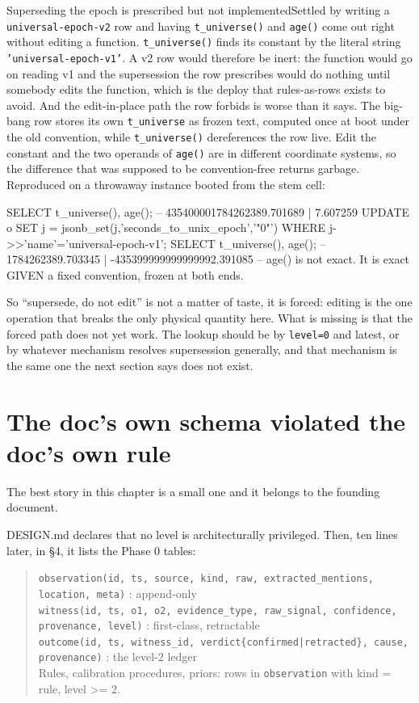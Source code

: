 \begin{Open}{Superseding the epoch is prescribed but not implemented}{Settled by writing a \texttt{universal-epoch-v2} row and having \texttt{t\_universe()} and \texttt{age()} come out right without editing a function.}
\texttt{t\_universe()} finds its constant by the literal string \texttt{'universal-epoch-v1'}. A v2 row would therefore be inert: the function would go on reading v1 and the supersession the row prescribes would do nothing until somebody edits the function, which is the deploy that rules-as-rows exists to avoid. And the edit-in-place path the row forbids is worse than it says. The big-bang row stores its own \texttt{t\_universe} as frozen text, computed once at boot under the old convention, while \texttt{t\_universe()} dereferences the row live. Edit the constant and the two operands of \texttt{age()} are in different coordinate systems, so the difference that was supposed to be convention-free returns garbage. Reproduced on a throwaway instance booted from the stem cell:
\begin{Check}
SELECT t_universe(), age();
--  435400001784262389.701689 |   7.607259
UPDATE o SET j = jsonb_set(j,'{seconds_to_unix_epoch}','"0"')
  WHERE j->>'name'='universal-epoch-v1';
SELECT t_universe(), age();
--  1784262389.703345 | -435399999999999992.391085
-- age() is not exact. It is exact GIVEN a fixed convention, frozen at both ends.
\end{Check}
So ``supersede, do not edit'' is not a matter of taste, it is forced: editing is the one operation that breaks the only physical quantity here. What is missing is that the forced path does not yet work. The lookup should be by \texttt{level=0} and latest, or by whatever mechanism resolves supersession generally, and that mechanism is the same one the next section says does not exist.
\end{Open}

\section{The doc's own schema violated the doc's own rule}

The best story in this chapter is a small one and it belongs to the founding document.

DESIGN.md declares that no level is architecturally privileged. Then, ten lines later, in \S4, it lists the Phase 0 tables:

\begin{quote}
\texttt{observation(id, ts, source, kind, raw, extracted\_mentions, location, meta)} : append-only \\
\texttt{witness(id, ts, o1, o2, evidence\_type, raw\_signal, confidence, provenance, level)} : first-class, retractable \\
\texttt{outcome(id, ts, witness\_id, verdict\{confirmed|retracted\}, cause, provenance)} : the level-2 ledger \\
Rules, calibration procedures, priors: rows in \texttt{observation} with kind = rule, level >= 2.
\end{quote}

